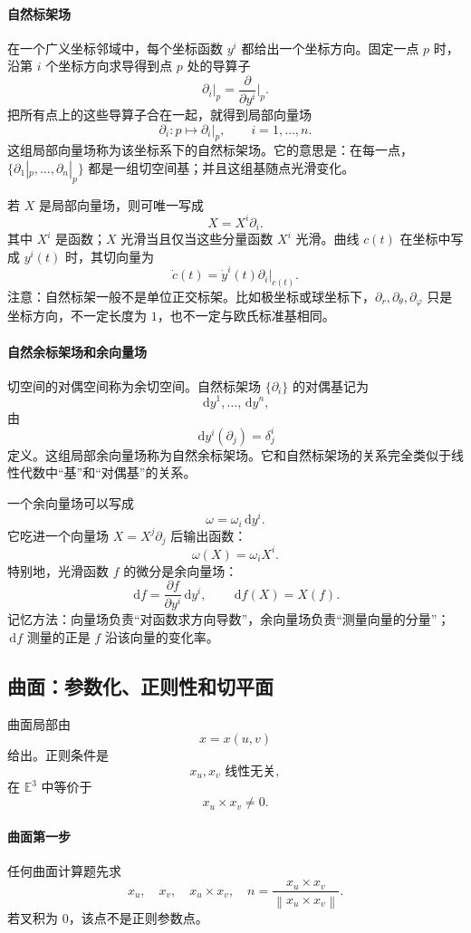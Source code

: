\documentclass[UTF8,12pt,a4paper]{ctexart}
\newcommand{\E}{\mathbb E}
\newcommand{\dd}{\,\mathrm d}
\newcommand{\norm}[1]{\left\lVert #1\right\rVert}
\begin{document}
\paragraph{自然标架场}
在一个广义坐标邻域中，每个坐标函数 $y^i$ 都给出一个坐标方向。固定一点 $p$ 时，沿第 $i$ 个坐标方向求导得到点 $p$ 处的导算子
\[
\partial_i|_p=\frac{\partial}{\partial y^i}\bigg|_p.
\]
把所有点上的这些导算子合在一起，就得到局部向量场
\[
\partial_i:p\longmapsto \partial_i|_p,\qquad i=1,\dots,n.
\]
这组局部向量场称为该坐标系下的自然标架场。它的意思是：在每一点，$\{\partial_1|_p,\dots,\partial_n|_p\}$ 都是一组切空间基；并且这组基随点光滑变化。

若 $X$ 是局部向量场，则可唯一写成
\[
X=X^i\partial_i.
\]
其中 $X^i$ 是函数；$X$ 光滑当且仅当这些分量函数 $X^i$ 光滑。曲线 $c(t)$ 在坐标中写成 $y^i(t)$ 时，其切向量为
\[
\dot c(t)=\dot y^i(t)\partial_i|_{c(t)}.
\]
注意：自然标架一般不是单位正交标架。比如极坐标或球坐标下，$\partial_r,\partial_\theta,\partial_\varphi$ 只是坐标方向，不一定长度为 $1$，也不一定与欧氏标准基相同。

\paragraph{自然余标架场和余向量场}
切空间的对偶空间称为余切空间。自然标架场 $\{\partial_i\}$ 的对偶基记为
\[
\dd y^1,\dots,\dd y^n,
\]
由
\[
\dd y^i(\partial_j)=\delta^i_j
\]
定义。这组局部余向量场称为自然余标架场。它和自然标架场的关系完全类似于线性代数中“基”和“对偶基”的关系。

一个余向量场可以写成
\[
\omega=\omega_i\dd y^i.
\]
它吃进一个向量场 $X=X^j\partial_j$ 后输出函数：
\[
\omega(X)=\omega_iX^i.
\]
特别地，光滑函数 $f$ 的微分是余向量场：
\[
\dd f=\frac{\partial f}{\partial y^i}\dd y^i,
\qquad
\dd f(X)=X(f).
\]
记忆方法：向量场负责“对函数求方向导数”，余向量场负责“测量向量的分量”；$\dd f$ 测量的正是 $f$ 沿该向量的变化率。

\subsection{曲面：参数化、正则性和切平面}

曲面局部由
\[
x=x(u,v)
\]
给出。正则条件是
\[
x_u,x_v \text{ 线性无关},
\]
在 $\E^3$ 中等价于
\[
x_u\times x_v\ne0.
\]

\paragraph{曲面第一步}
任何曲面计算题先求
\[
x_u,\quad x_v,\quad x_u\times x_v,\quad
n=\frac{x_u\times x_v}{\norm{x_u\times x_v}}.
\]
若叉积为 $0$，该点不是正则参数点。
\end{document}
